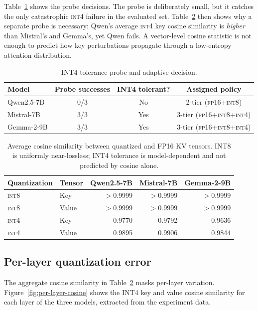 \documentclass[11pt]{article}
\newcommand{\fp}{\textsc{fp16}}
\newcommand{\intviii}{\textsc{int8}}
\newcommand{\intiv}{\textsc{int4}}
\theoremstyle{plain}
\theoremstyle{definition}
\begin{document}
Table~\ref{tab:probe} shows the probe decisions.  The probe is deliberately small, but it catches the only catastrophic \intiv{} failure in the evaluated set.  Table~\ref{tab:cosine} then shows why a separate probe is necessary: Qwen's average \intiv{} key cosine similarity is \emph{higher} than Mistral's and Gemma's, yet Qwen fails.  A vector-level cosine statistic is not enough to predict how key perturbations propagate through a low-entropy attention distribution.

\begin{table}[t]
\centering
\caption{INT4 tolerance probe and adaptive decision.}
\label{tab:probe}
\small
\begin{tabular}{lccc}
\toprule
Model & Probe successes & INT4 tolerant? & Assigned policy \\
\midrule
Qwen2.5-7B & 0/3 & No & 2-tier (\fp{}+\intviii{}) \\
Mistral-7B & 3/3 & Yes & 3-tier (\fp{}+\intviii{}+\intiv{}) \\
Gemma-2-9B & 3/3 & Yes & 3-tier (\fp{}+\intviii{}+\intiv{}) \\
\bottomrule
\end{tabular}
\end{table}

\begin{table}[t]
\centering
\caption{Average cosine similarity between quantized and FP16 KV tensors.  INT8 is uniformly near-lossless; INT4 tolerance is model-dependent and not predicted by cosine alone.}
\label{tab:cosine}
\small
\begin{tabular}{llrrr}
\toprule
Quantization & Tensor & Qwen2.5-7B & Mistral-7B & Gemma-2-9B \\
\midrule
\intviii{} & Key & $>$0.9999 & $>$0.9999 & $>$0.9999 \\
\intviii{} & Value & $>$0.9999 & $>$0.9999 & $>$0.9999 \\
\intiv{} & Key & 0.9770 & 0.9792 & 0.9636 \\
\intiv{} & Value & 0.9895 & 0.9906 & 0.9844 \\
\bottomrule
\end{tabular}
\end{table}

\subsection{Per-layer quantization error}
\label{sec:per-layer-quant}

The aggregate cosine similarity in Table~\ref{tab:cosine} masks per-layer variation.  Figure~\ref{fig:per-layer-cosine} shows the INT4 key and value cosine similarity for each layer of the three models, extracted from the experiment data.
\end{document}
